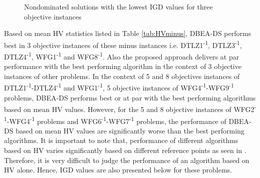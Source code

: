 \documentclass{sig-alternate}
\begin{document}
\begin{figure}[!htb]
\caption{Nondominated solutions with the lowest IGD values for three objective instances}
\label{fig:frontminus}
\end{figure}

 Based on mean HV statistics listed in Table \ref{tab:HVminus}, DBEA-DS performs best in 3 objective instances of these minus instances i.e. DTLZ1\textsuperscript{-1}, DTLZ3\textsuperscript{-1}, DTLZ4\textsuperscript{-1}, WFG1\textsuperscript{-1} and WFG8\textsuperscript{-1}. Also the proposed approach delivers at par performance with the best performing algorithm in the context of 3 objective instances of other problems. In the context of 5 and 8 objectives instances of DTLZ1\textsuperscript{-1}-DTLZ4\textsuperscript{-1} and WFG1\textsuperscript{-1}, 5 objective instances of  WFG4\textsuperscript{-1}-WFG9\textsuperscript{-1} problems, DBEA-DS performs best or at par with the best performing algorithms based on mean HV values. However, for the 5 and 8 objective instances of WFG2\textsuperscript{-1}-WFG4\textsuperscript{-1} problems and WFG6\textsuperscript{-1}-WFG7\textsuperscript{-1} problems, the performance of DBEA-DS based on mean HV values are significantly worse than the best performing algorithms. It is important to note that, performance of different algorithms based on HV varies significantly based on different reference points as seen in \cite{ishibuchi2016inverse}. Therefore, it is very difficult to judge the performance of an algorithm based on HV alone. Hence, IGD values are also presented below for these problems.  
\end{document}
